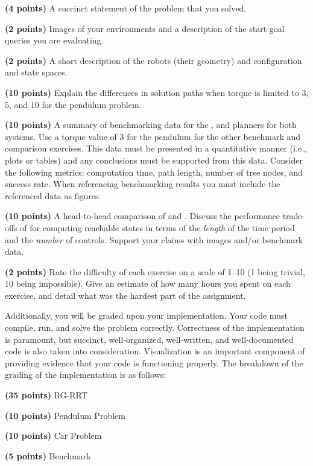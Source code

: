 \documentclass{comp450}
\begin{document}
\begin{itemize*}\vspace*{-\baselineskip}
	\item \textbf{(4 points)}
	      A succinct statement of the problem that you solved.
	\item \textbf{(2 points)}
	      Images of your environments and a description of the start-goal queries you are evaluating.
	\item \textbf{(2 points)}
	      A short description of the robots (their geometry) and configuration and state spaces.
	\item \textbf{(10 points)}
	      Explain the differences in solution paths when torque is limited to 3, 5, and 10 for the pendulum problem.
	\item \textbf{(10 points)}
	      A summary of benchmarking data for the ,  and  planners for both systems.
	      Use a torque value of 3 for the pendulum for the other benchmark and comparison exercises.
	      This data must be presented in a quantitative manner (i.e., plots or tables) and any conclusions must be supported from this data.
	      Consider the following metrics: computation time, path length, number of tree nodes, and success rate.
	      When referencing benchmarking results you must include the referenced data as figures.
	\item \textbf{(10 points)}
	      A head-to-head comparison of  and .
	      Discuss the performance trade-offs of  for computing reachable states in terms of the \emph{length} of the time period and the \emph{number} of controls.
	      Support your claims with images and/or benchmark data.
	\item \textbf{(2 points)}
	      Rate the difficulty of each exercise on a scale of 1--10 (1 being trivial, 10 being impossible).
	      Give an estimate of how many hours you spent on each exercise, and detail what was the hardest part of the assignment.
\end{itemize*}

Additionally, you will be graded upon your implementation.
Your code must compile, run, and solve the problem correctly.
Correctness of the implementation is paramount, but succinct, well-organized, well-written, and well-documented code is also taken into consideration.
Visualization is an important component of providing evidence that your code is functioning properly.
The breakdown of the grading of the implementation is as follows:
\begin{itemize*}
	\vspace{-\baselineskip}
	\item \textbf{(35 points)} RG-RRT
	\item \textbf{(10 points)} Pendulum Problem
	\item \textbf{(10 points)} Car Problem
	\item \textbf{(5 points)} Benchmark
	      \vspace{-\baselineskip}
\end{itemize*}
\end{document}
